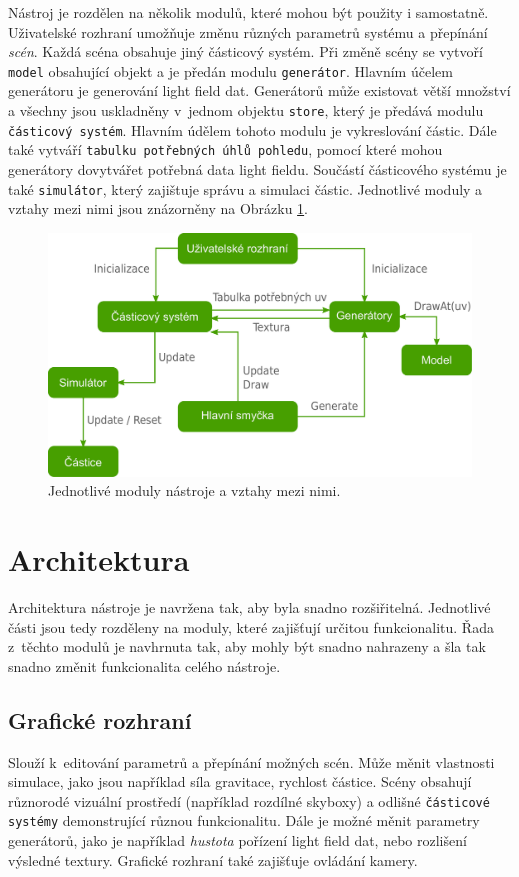 Nástroj je rozdělen na několik modulů, které mohou být použity i samostatně. Uživatelské rozhraní umožňuje změnu různých parametrů systému a přepínání \emph{scén}. Každá scéna obsahuje jiný částicový systém. Při změně scény se vytvoří \texttt{model} obsahující objekt a je předán modulu \texttt{generátor}. Hlavním účelem generátoru je generování light field dat. Generátorů může existovat větší množství a všechny jsou uskladněny v~jednom objektu \texttt{store}, který je předává modulu \texttt{částicový systém}. Hlavním údělem tohoto modulu je vykreslování částic. Dále také vytváří \texttt{tabulku potřebných úhlů pohledu}, pomocí které mohou generátory dovytvářet potřebná data light fieldu. Součástí částicového systému je také \texttt{simulátor}, který zajištuje správu a simulaci částic. Jednotlivé moduly a vztahy mezi nimi jsou znázorněny na Obrázku \ref{fig:navrh_uml}.

\begin{figure}[H]
	\centering
		\includegraphics[width=1.0\textwidth]{obrazky-figures/diagrambpfull.pdf}
	\caption{Jednotlivé moduly nástroje a vztahy mezi nimi.}
	\label{fig:navrh_uml}
\end{figure}



\section{Architektura}
\label{sec_architecture}
Architektura nástroje je navržena tak, aby byla snadno rozšiřitelná. Jednotlivé části jsou tedy rozděleny na moduly, které zajišťují určitou funkcionalitu. Řada z~těchto modulů je navhrnuta tak, aby mohly být snadno nahrazeny a šla tak snadno změnit funkcionalita celého nástroje.
\subsection*{Grafické rozhraní} Slouží k~editování parametrů a přepínání možných scén. Může měnit vlastnosti simulace, jako jsou například síla gravitace, rychlost částice. Scény obsahují různorodé vizuální prostředí (například rozdílné skyboxy) a odlišné \texttt{částicové systémy} demonstrující různou funkcionalitu. Dále je možné měnit parametry generátorů, jako je například \emph{hustota} pořízení light field dat, nebo rozlišení výsledné textury. Grafické rozhraní také zajišťuje ovládání kamery.  

